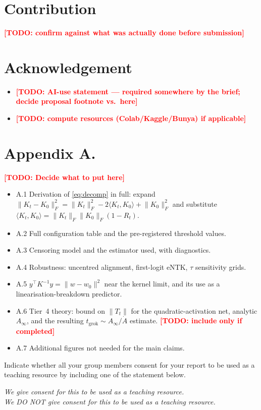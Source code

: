 \documentclass[a4paper,11pt]{article} %
\newcommand{\TODO}[1]{\textcolor{red}{\textbf{[TODO: #1]}}}
\newcommand{\Fnorm}[1]{\lVert #1 \rVert_F}
\newcommand{\tgrok}{t_{\mathrm{grok}}}
\begin{document}
\section*{Contribution}

\TODO{confirm against what was actually done before submission}


\section*{Acknowledgement}

\begin{itemize}
	\item \TODO{AI-use statement --- required somewhere by the brief; decide
		proposal footnote vs.\ here}
	\item \TODO{compute resources (Colab/Kaggle/Bunya) if applicable}
\end{itemize}

\section*{Appendix A.}
\label{sec:appendix}

\TODO{Decide what to put here}
\begin{itemize}
	\item A.1 Derivation of \eqref{eq:decomp} in full: expand
		$\Fnorm{K_t-K_0}^2=\Fnorm{K_t}^2-2\langle K_t,K_0\rangle+\Fnorm{K_0}^2$ and
		substitute $\langle K_t,K_0\rangle=\Fnorm{K_t}\Fnorm{K_0}(1-R_t)$.
	\item A.2 Full configuration table and the pre-registered threshold values.
	\item A.3 Censoring model and the estimator used, with diagnostics.
	\item A.4 Robustness: uncentred alignment, first-logit eNTK, $\tau$
		sensitivity grids.
	\item A.5 $y^\top K^{-1}y=\lVert w-w_0\rVert^2$ near the kernel limit, and its
		use as a linearisation-breakdown predictor.
	\item A.6 Tier~4 theory: bound on $\lVert T_t\rVert$ for the quadratic-activation
		net, analytic $A_\infty$, and the resulting $\tgrok\sim A_\infty/\dot A$
		estimate. \TODO{include only if completed}
	\item A.7 Additional figures not needed for the main claims.
\end{itemize}

\smaller
\printbibliography

\newpage
Indicate whether all your group members consent for your report to be used as a
teaching resource by including one of the statement below.

\begin{center}
\emph{We give consent for this to be used as a teaching resource.}\\
\emph{We DO NOT give consent for this to be used as a teaching resource.}
\end{center}
\end{document}
